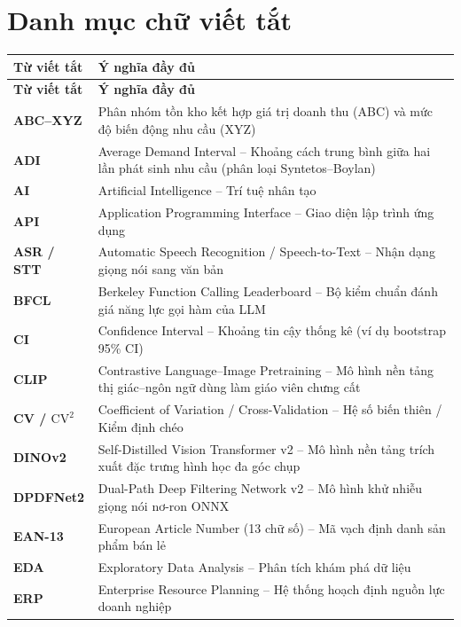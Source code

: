 \chapter*{Danh mục chữ viết tắt}

\begin{longtable}{|L{3.4cm}|L{11.1cm}|}
\hline
\textbf{Từ viết tắt} & \textbf{Ý nghĩa đầy đủ} \\
\hline
\endfirsthead
\hline
\textbf{Từ viết tắt} & \textbf{Ý nghĩa đầy đủ} \\
\hline
\endhead
\hline
\endfoot
\textbf{ABC--XYZ} & Phân nhóm tồn kho kết hợp giá trị doanh thu (ABC) và mức độ biến động nhu cầu (XYZ) \\
\hline
\textbf{ADI} & Average Demand Interval -- Khoảng cách trung bình giữa hai lần phát sinh nhu cầu (phân loại Syntetos--Boylan) \\
\hline
\textbf{AI} & Artificial Intelligence -- Trí tuệ nhân tạo \\
\hline
\textbf{API} & Application Programming Interface -- Giao diện lập trình ứng dụng \\
\hline
\textbf{ASR / STT} & Automatic Speech Recognition / Speech-to-Text -- Nhận dạng giọng nói sang văn bản \\
\hline
\textbf{BFCL} & Berkeley Function Calling Leaderboard -- Bộ kiểm chuẩn đánh giá năng lực gọi hàm của LLM \\
\hline
\textbf{CI} & Confidence Interval -- Khoảng tin cậy thống kê (ví dụ bootstrap 95\% CI) \\
\hline
\textbf{CLIP} & Contrastive Language--Image Pretraining -- Mô hình nền tảng thị giác--ngôn ngữ dùng làm giáo viên chưng cất \\
\hline
\textbf{CV / $\text{CV}^2$} & Coefficient of Variation / Cross-Validation -- Hệ số biến thiên / Kiểm định chéo \\
\hline
\textbf{DINOv2} & Self-Distilled Vision Transformer v2 -- Mô hình nền tảng trích xuất đặc trưng hình học đa góc chụp \\
\hline
\textbf{DPDFNet2} & Dual-Path Deep Filtering Network v2 -- Mô hình khử nhiễu giọng nói nơ-ron ONNX \\
\hline
\textbf{EAN-13} & European Article Number (13 chữ số) -- Mã vạch định danh sản phẩm bán lẻ \\
\hline
\textbf{EDA} & Exploratory Data Analysis -- Phân tích khám phá dữ liệu \\
\hline
\textbf{ERP} & Enterprise Resource Planning -- Hệ thống hoạch định nguồn lực doanh nghiệp \\

\end{longtable}
